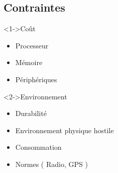 \subsection{Contraintes}
\begin{frame}
	\begin{block}<1->{Coût}
		\begin{itemize}
			\item Processeur
			\item Mémoire
			\item Périphériques
		\end{itemize}
	\end{block}
	\begin{block}<2->{Environnement}
		\begin{itemize}
			\item Durabilité
			\item Environnement physique hostile
			\item Consommation
			\item Normes ( Radio, GPS )
		\end{itemize}
	\end{block}
\end{frame}


